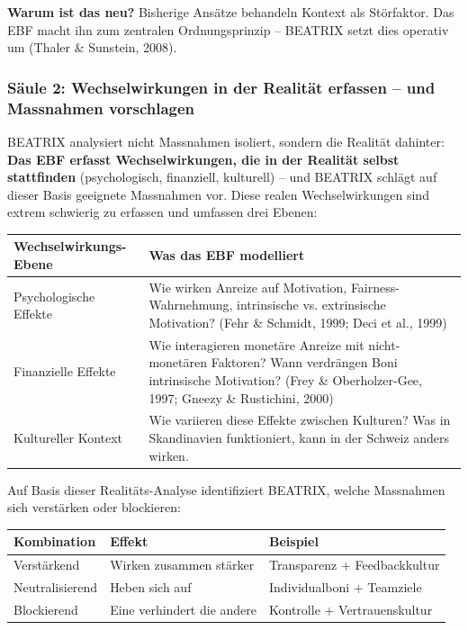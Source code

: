 \documentclass[11pt,a4paper]{article}
\begin{document}
\textbf{Warum ist das neu?} Bisherige Ansätze behandeln Kontext als Störfaktor. Das EBF macht ihn zum zentralen Ordnungsprinzip -- BEATRIX setzt dies operativ um (Thaler \& Sunstein, 2008).

\subsubsection{Säule 2: Wechselwirkungen in der Realität erfassen -- und Massnahmen vorschlagen}

BEATRIX analysiert nicht Massnahmen isoliert, sondern die Realität dahinter: \textbf{Das EBF erfasst Wechselwirkungen, die in der Realität selbst stattfinden} (psychologisch, finanziell, kulturell) -- und BEATRIX schlägt auf dieser Basis geeignete Massnahmen vor. Diese realen Wechselwirkungen sind extrem schwierig zu erfassen und umfassen drei Ebenen:

\begin{table}[h]
\centering
\begin{tabular}{@{}L{4cm}L{9cm}@{}}
\toprule
\textbf{Wechselwirkungs-Ebene} & \textbf{Was das EBF modelliert} \\
\midrule
Psychologische Effekte & Wie wirken Anreize auf Motivation, Fairness-Wahrnehmung, intrinsische vs. extrinsische Motivation? (Fehr \& Schmidt, 1999; Deci et al., 1999) \\
Finanzielle Effekte & Wie interagieren monetäre Anreize mit nicht-monetären Faktoren? Wann verdrängen Boni intrinsische Motivation? (Frey \& Oberholzer-Gee, 1997; Gneezy \& Rustichini, 2000) \\
Kultureller Kontext & Wie variieren diese Effekte zwischen Kulturen? Was in Skandinavien funktioniert, kann in der Schweiz anders wirken. \\
\bottomrule
\end{tabular}
\end{table}

Auf Basis dieser Realitäts-Analyse identifiziert BEATRIX, welche Massnahmen sich verstärken oder blockieren:

\begin{table}[h]
\centering
\begin{tabular}{@{}L{3cm}L{4cm}L{6cm}@{}}
\toprule
\textbf{Kombination} & \textbf{Effekt} & \textbf{Beispiel} \\
\midrule
Verstärkend & Wirken zusammen stärker & Transparenz + Feedbackkultur \\
Neutralisierend & Heben sich auf & Individualboni + Teamziele \\
Blockierend & Eine verhindert die andere & Kontrolle + Vertrauenskultur \\
\bottomrule
\end{tabular}
\end{table}
\end{document}
